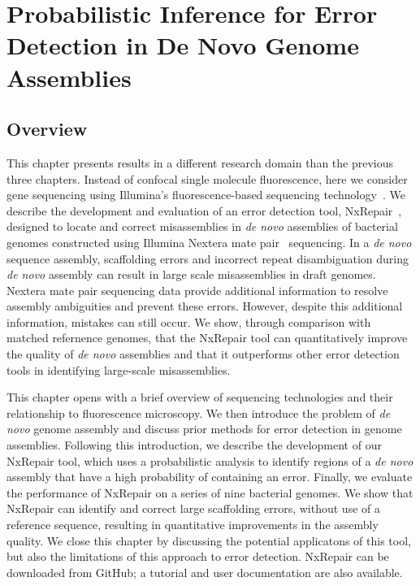 \chapter{Probabilistic Inference for Error Detection in De Novo Genome Assemblies}
\label{chap:illumina}
\section{Overview}
This chapter presents results in a different research domain than the previous three chapters. Instead of confocal single molecule fluorescence, here we consider gene sequencing using Illumina's fluorescence-based sequencing technology~\cite{bentley2008}. We describe the development and evaluation of an error detection tool, NxRepair~\cite{murphy2015}, designed to locate and correct misassemblies in \textit{de novo} assemblies of bacterial genomes constructed using Illumina Nextera mate pair~\cite{nextera2012} sequencing. In a \textit{de novo} sequence assembly, scaffolding errors and incorrect repeat disambiguation during \textit{de novo} assembly can result in large scale misassemblies in draft genomes. Nextera mate pair sequencing data provide additional information to resolve assembly ambiguities and prevent these errors. However, despite this additional information, mistakes can still occur. We show, through comparison with matched refernence genomes, that the NxRepair tool can quantitatively improve the quality of \textit{de novo} assemblies and that it outperforms other error detection tools in identifying large-scale misassemblies.

This chapter opens with a brief overview of sequencing technologies and their relationship to fluorescence microscopy. We then introduce the problem of \textit{de novo} genome assembly and discuss prior methods for error detection in genome assemblies. Following this introduction, we describe the development of our NxRepair tool, which uses a probabilistic analysis to identify regions of a \textit{de novo} assembly that have a high probability of containing an error. Finally, we evaluate the performance of NxRepair on a series of nine bacterial genomes. We show that NxRepair can identify and correct large scaffolding errors, without use of a reference sequence, resulting in quantitative improvements in the assembly quality. We close this chapter by discussing the potential applicatons of this tool, but also the limitations of this approach to error detection. NxRepair can be downloaded from GitHub; a tutorial and user documentation are also available.
 

